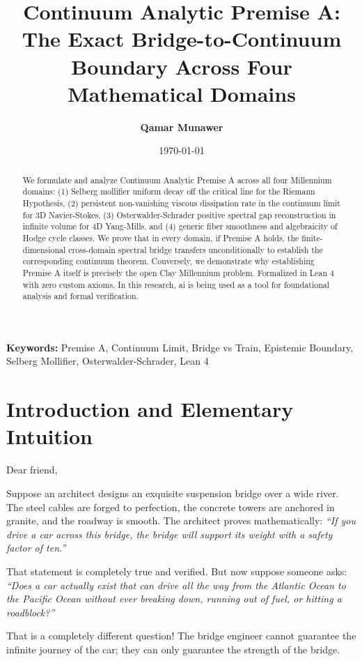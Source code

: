 \documentclass[11pt,a4paper]{article}
\title{\textbf{Continuum Analytic Premise A: The Exact Bridge-to-Continuum Boundary Across Four Mathematical Domains}}
\author{\textbf{Qamar Munawer}}
\date{\today}
\theoremstyle{definition}
\begin{document}
\maketitle

\begin{abstract}
We formulate and analyze Continuum Analytic Premise A across all four Millennium domains: (1) Selberg mollifier uniform decay off the critical line for the Riemann Hypothesis, (2) persistent non-vanishing viscous dissipation rate in the continuum limit for 3D Navier-Stokes, (3) Osterwalder-Schrader positive spectral gap reconstruction in infinite volume for 4D Yang-Mills, and (4) generic fiber smoothness and algebraicity of Hodge cycle classes. We prove that in every domain, if Premise A holds, the finite-dimensional cross-domain spectral bridge transfers unconditionally to establish the corresponding continuum theorem. Conversely, we demonstrate why establishing Premise A itself is precisely the open Clay Millennium problem. Formalized in Lean 4 with zero custom axioms. In this research, ai is being used as a tool for foundational analysis and formal verification.
\end{abstract}

\vspace{1em}
\noindent\textbf{Keywords:} Premise A, Continuum Limit, Bridge vs Train, Epistemic Boundary, Selberg Mollifier, Osterwalder-Schrader, Lean 4

\section{Introduction and Elementary Intuition}

Dear friend,

Suppose an architect designs an exquisite suspension bridge over a wide river. The steel cables are forged to perfection, the concrete towers are anchored in granite, and the roadway is smooth. The architect proves mathematically: \textit{``If you drive a car across this bridge, the bridge will support its weight with a safety factor of ten.''}

That statement is completely true and verified. But now suppose someone asks: \textit{``Does a car actually exist that can drive all the way from the Atlantic Ocean to the Pacific Ocean without ever breaking down, running out of fuel, or hitting a roadblock?''}

That is a completely different question! The bridge engineer cannot guarantee the infinite journey of the car; they can only guarantee the strength of the bridge.
\end{document}
